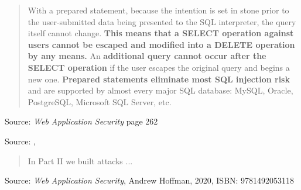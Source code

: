 \documentclass[Screen16to9,17pt]{foils}
\begin{document}
\begin{quote}
With a prepared statement, because the intention is set in stone prior to the user-submitted data being presented to the SQL interpreter, the query itself cannot change. {\bf This means that a SELECT operation against users cannot be escaped and modified into a DELETE operation by any means.} An {\bf additional query cannot occur after the SELECT operation} if the user escapes the original query and begins a new one. {\bf Prepared statements eliminate most SQL injection risk} and are supported by almost every major SQL database: MySQL, Oracle, PostgreSQL, Microsoft SQL Server, etc.
\end{quote}
Source: \emph{Web Application Security} page 262






\begin{quote}
\end{quote}
Source: \emph{},

\begin{list2}
\item
\end{list2}










\begin{quote}
In Part II we built attacks ...
\end{quote}
Source: \emph{Web Application Security}, Andrew Hoffman, 2020, ISBN: 9781492053118

\begin{list2}
\item
\end{list2}









\end{document}
